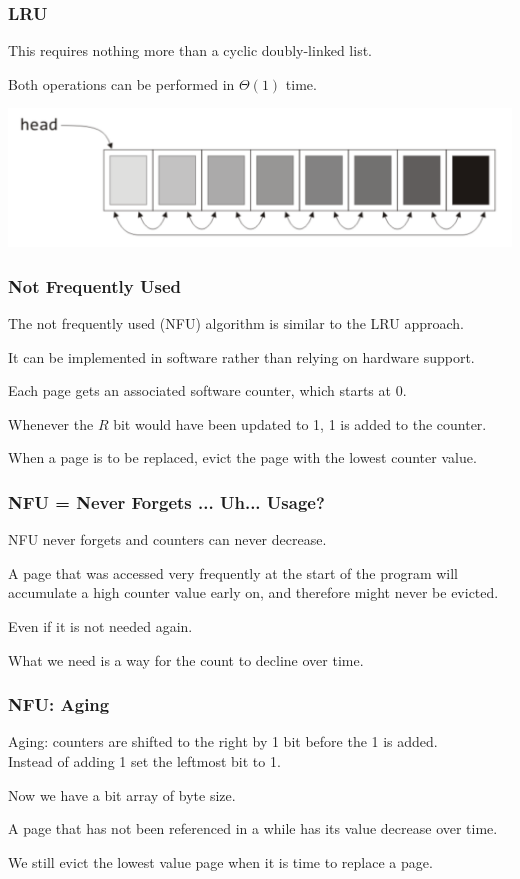 \begin{frame}
\frametitle{LRU}

This requires nothing more than a cyclic doubly-linked list. 

Both operations can be performed in $\Theta(1)$ time.

\begin{center}
\includegraphics[width=\textwidth]{images/lru-linkedlist.png}
\end{center}


\end{frame}

\begin{frame}
\frametitle{Not Frequently Used}

The not frequently used (NFU) algorithm is similar to the LRU approach.

It can be implemented in software rather than relying on hardware support.

Each page gets an associated software counter, which starts at 0. 

Whenever the $R$ bit would have been updated to 1, 1 is added to the counter. 

When a page is to be replaced, evict the page with the lowest counter value.

\end{frame}

\begin{frame}
\frametitle{NFU = Never Forgets ... Uh... Usage?}

NFU never forgets and counters can never decrease. 

A page that was accessed very frequently at the start of the program will accumulate a high counter value early on, and therefore might never be evicted.

Even if it is not needed again. 

What we need is a way for the count to decline over time. 



\end{frame}

\begin{frame}
\frametitle{NFU: Aging}

\alert{Aging}: counters are shifted to the right by 1 bit before the 1 is added.\\
\quad Instead of adding 1 set the leftmost bit to 1. 

Now we have a bit array of byte size.

A page that has not been referenced in a while has its value decrease over time. 

We still evict the lowest value page when it is time to replace a page.

\end{frame}

